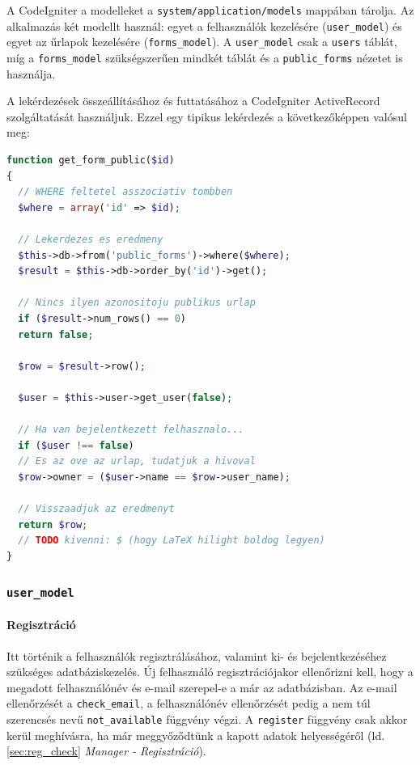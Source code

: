 \documentclass[12pt,a4paper,twoside]{article}
\begin{document}
A CodeIgniter a modelleket a \texttt{system/application/models} mappában
tárolja. Az alkalmazás két modellt használ: egyet a felhasználók kezelésére
(\texttt{user\_model}) és egyet az űrlapok kezelésére (\texttt{forms\_model}). A
\texttt{user\_model} csak a \texttt{users} táblát, míg a
\texttt{forms\_model} szükségszerűen mindkét táblát és a \texttt{public\_forms}
nézetet is használja.

A lekérdezések összeállításához és futtatásához a CodeIgniter ActiveRecord
szolgáltatását használjuk. Ezzel egy tipikus lekérdezés a következőképpen
valósul meg:

\begin{lstlisting}[language=PHP]
function get_form_public($id)
{
  // WHERE feltetel asszociativ tombben
  $where = array('id' => $id);

  // Lekerdezes es eredmeny
  $this->db->from('public_forms')->where($where);
  $result = $this->db->order_by('id')->get();

  // Nincs ilyen azonositoju publikus urlap
  if ($result->num_rows() == 0)
  return false;

  $row = $result->row();

  $user = $this->user->get_user(false);

  // Ha van bejelentkezett felhasznalo...
  if ($user !== false)
  // Es az ove az urlap, tudatjuk a hivoval
  $row->owner = ($user->name == $row->user_name);

  // Visszaadjuk az eredmenyt
  return $row;
  // TODO kivenni: $ (hogy LaTeX hilight boldog legyen)
}
\end{lstlisting}
\vspace{.8cm}

\subsubsection{\texttt{user\_model}}

\paragraph{Regisztráció}
Itt történik a felhasználók regisztrálásához, valamint ki- és bejelentkezéséhez
szükséges adatbáziskezelés. Új felhasználó regisztrációjakor ellenőrizni
kell, hogy a megadott felhasználónév és e-mail szerepel-e a már az
adatbázisban. Az e-mail ellenőrzését a \texttt{check\_email}, a felhasználónév
ellenőrzését pedig a nem túl szerencsés nevű \texttt{not\_available} függvény
végzi. A \texttt{register} függvény csak akkor kerül meghívásra, ha már
meggyőződtünk a kapott adatok helyességéről (ld. \ref{sec:reg_check} \textit{Manager -
Regisztráció}).
\end{document}
